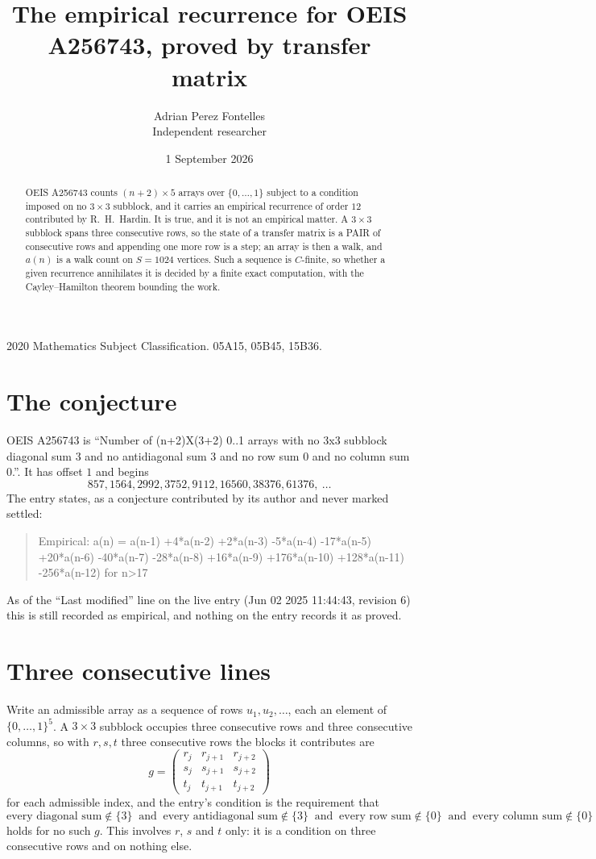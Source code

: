 \documentclass[11pt,a4paper]{article}
\title{The empirical recurrence for OEIS A256743, proved by transfer matrix}
\author{Adrian Perez Fontelles\\ \small Independent researcher}
\date{1 September 2026}
\theoremstyle{plain}
\theoremstyle{definition}
\begin{document}
\maketitle

\begin{abstract}
OEIS A256743 counts $(n+2)\times5$ arrays over $\{0,\dots,1\}$ subject to a condition imposed on
no $3\times3$ subblock, and it carries an empirical recurrence of order $12$
contributed by R.~H.~Hardin. It is true, and it is not an empirical matter. A $3\times3$
subblock spans three consecutive rows, so the state of a transfer matrix is a PAIR of
consecutive rows and appending one more row is a step; an array is then a walk, and
$a(n)$ is a walk count on $S=1024$ vertices. Such a sequence is $C$-finite, so whether a given
recurrence annihilates it is decided by a finite exact computation, with the Cayley--Hamilton
theorem bounding the work.
\end{abstract}

\noindent\small 2020 Mathematics Subject Classification. 05A15, 05B45, 15B36.\normalsize

\section{The conjecture}

OEIS A256743 is ``Number of (n+2)X(3+2) 0..1 arrays with no 3x3 subblock diagonal sum 3 and no antidiagonal sum 3 and no row sum 0 and no column sum 0.''. It has offset $1$ and begins
\[
857, 1564, 2992, 3752, 9112, 16560, 38376, 61376,\ \dots
\]
The entry states, as a conjecture contributed by its author and never marked settled:
\begin{quote}
Empirical: a(n) = a(n-1) +4*a(n-2) +2*a(n-3) -5*a(n-4) -17*a(n-5) +20*a(n-6) -40*a(n-7) -28*a(n-8) +16*a(n-9) +176*a(n-10) +128*a(n-11) -256*a(n-12) for n>17
\end{quote}
As of the ``Last modified'' line on the live entry (Jun 02 2025 11:44:43, revision 6) this is still
recorded as empirical, and nothing on the entry records it as proved.

\section{Three consecutive lines}

Write an admissible array as a sequence of rows $u_1,u_2,\dots$, each an element of
$\{0,\dots,1\}^{5}$. A $3\times3$ subblock occupies three consecutive rows and
three consecutive columns, so with $r,s,t$ three consecutive rows the blocks it
contributes are
\[
g=\begin{pmatrix}r_j&r_{j+1}&r_{j+2}\\ s_j&s_{j+1}&s_{j+2}\\ t_j&t_{j+1}&t_{j+2}\end{pmatrix}
\]
for each admissible index, and the entry's condition is the requirement that
\[
\text{every diagonal sum} \notin \{3\}\ \text{ and }\ \text{every antidiagonal sum} \notin \{3\}\ \text{ and }\ \text{every row sum} \notin \{0\}\ \text{ and }\ \text{every column sum} \notin \{0\}
\]
holds for no such $g$. This involves $r$, $s$ and $t$ only: it is a condition on
three consecutive rows and on nothing else.
\end{document}
